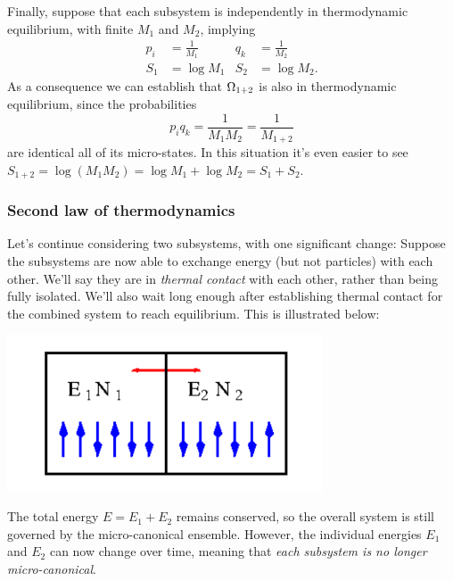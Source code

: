 Finally, suppose that each subsystem is independently in thermodynamic equilibrium, with finite $M_1$ and $M_2$, implying
\begin{align*}
  p_i & = \frac{1}{M_1} & q_k & = \frac{1}{M_2} \\
  S_1 & = \log M_1      & S_2 & = \log M_2.
\end{align*}
As a consequence we can establish that $\Omega_{1+2}$ is also in thermodynamic equilibrium, since the probabilities
\begin{equation*}
  p_i q_k = \frac{1}{M_1 M_2} = \frac{1}{M_{1+2}}
\end{equation*}
are identical all of its micro-states.
In this situation it's even easier to see $S_{1+2} = \log\left(M_1 M_2\right) = \log M_1 + \log M_2 = S_1 + S_2$.



\subsubsection{\label{sec:second_law}Second law of thermodynamics}
Let's continue considering two subsystems, with one significant change: Suppose the subsystems are now able to exchange energy (but not particles) with each other.
We'll say they are in \textit{thermal contact} with each other, rather than being fully isolated.
We'll also wait long enough after establishing thermal contact for the combined system \Om to reach equilibrium.
This is illustrated below:
\begin{center}
  \includegraphics[width=0.7\textwidth]{figs/unit02_entropy-exchange.pdf}
\end{center}
The total energy $E = E_1 + E_2$ remains conserved, so the overall system \Om is still governed by the micro-canonical ensemble.
However, the individual energies $E_1$ and $E_2$ can now change over time, meaning that \textit{each subsystem is no longer micro-canonical}.

